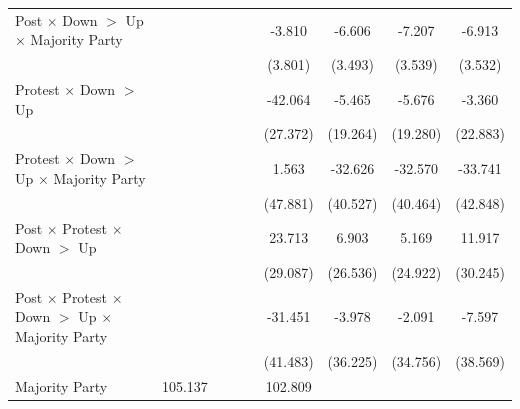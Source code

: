 {\begin{tabular}{l*{8}{c}}
Post $\times$ Down $>$ Up $\times$ Majority Party&                     &                     &                     &                     &      -3.810         &      -6.606\sym{*}  &      -7.207\sym{**} &      -6.913\sym{*}  \\
            &                     &                     &                     &                     &     (3.801)         &     (3.493)         &     (3.539)         &     (3.532)         \\
Protest $\times$ Down $>$ Up&                     &                     &                     &                     &     -42.064         &      -5.465         &      -5.676         &      -3.360         \\
            &                     &                     &                     &                     &    (27.372)         &    (19.264)         &    (19.280)         &    (22.883)         \\
Protest $\times$ Down $>$ Up $\times$ Majority Party&                     &                     &                     &                     &       1.563         &     -32.626         &     -32.570         &     -33.741         \\
            &                     &                     &                     &                     &    (47.881)         &    (40.527)         &    (40.464)         &    (42.848)         \\
Post $\times$ Protest $\times$ Down $>$ Up&                     &                     &                     &                     &      23.713         &       6.903         &       5.169         &      11.917         \\
            &                     &                     &                     &                     &    (29.087)         &    (26.536)         &    (24.922)         &    (30.245)         \\
Post $\times$ Protest $\times$ Down $>$ Up $\times$ Majority Party&                     &                     &                     &                     &     -31.451         &      -3.978         &      -2.091         &      -7.597         \\
            &                     &                     &                     &                     &    (41.483)         &    (36.225)         &    (34.756)         &    (38.569)         \\
Majority Party&     105.137\sym{***}&                     &                     &                     &     102.809\sym{***}&                     &                     &                     \\

\end{tabular}}
